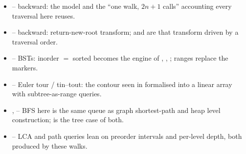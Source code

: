 \begin{itemize}[nosep, leftmargin=1.4em]
  \item {} -- backward: the  model and the ``one walk, $2n+1$
        calls'' accounting every traversal here reuses.
  \item {} -- backward: return-new-root transform;  and
         are that transform driven by a traversal order.
  \item {} -- BSTs: inorder $=$ sorted becomes the engine of ,
        , ; ranges replace the markers.
  \item {} -- Euler tour / tin--tout: the contour seen in 
        formalised into a linear array with subtree-as-range queries.
  \item {},  -- BFS here is the same queue as graph shortest-path and
        heap level construction;  is the tree case of both.
  \item {} -- LCA and path queries lean on preorder intervals and per-level depth,
        both produced by these walks.
\end{itemize}

